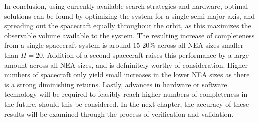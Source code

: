 In conclusion, using currently available search strategies and hardware, optimal solutions can be found by optimizing the system for a single semi-major axis, and spreading out the spacecraft equally throughout the orbit, as this maximizes the observable volume available to the system. The resulting increase of completeness from a single-spacecraft system is around 15-20\% across all NEA sizes smaller than $H=20$. Addition of a second spacecraft raises this performance by a large amount across all NEA sizes, and is defninitely worthy of consideration. Higher numbers of spacecraft only yield small increases in the lower NEA sizes as there is a strong diminishing returns. Lastly, advances in hardware or software technology will be required to feasibly reach higher numbers of completeness in the future, should this be considered. In the next chapter, the accuracy of these results will be examined through the process of verification and validation.
